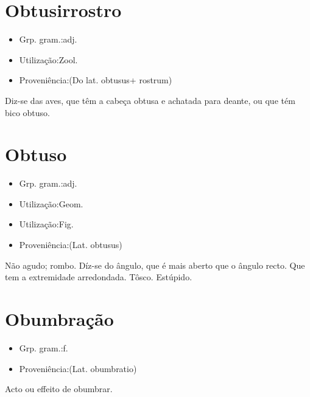 \section{Obtusirrostro}
\begin{itemize}
\item {Grp. gram.:adj.}
\end{itemize}
\begin{itemize}
\item {Utilização:Zool.}
\end{itemize}
\begin{itemize}
\item {Proveniência:(Do lat. \textunderscore obtusus\textunderscore  + \textunderscore rostrum\textunderscore )}
\end{itemize}
Diz-se das aves, que têm a cabeça obtusa e achatada para deante, ou que tém bico obtuso.
\section{Obtuso}
\begin{itemize}
\item {Grp. gram.:adj.}
\end{itemize}
\begin{itemize}
\item {Utilização:Geom.}
\end{itemize}
\begin{itemize}
\item {Utilização:Fig.}
\end{itemize}
\begin{itemize}
\item {Proveniência:(Lat. \textunderscore obtusus\textunderscore )}
\end{itemize}
Não agudo; rombo.
Díz-se do ângulo, que é mais aberto que o ângulo recto.
Que tem a extremidade arredondada.
Tôsco.
Estúpido.
\section{Obumbração}
\begin{itemize}
\item {Grp. gram.:f.}
\end{itemize}
\begin{itemize}
\item {Proveniência:(Lat. \textunderscore obumbratio\textunderscore )}
\end{itemize}
Acto ou effeito de obumbrar.
